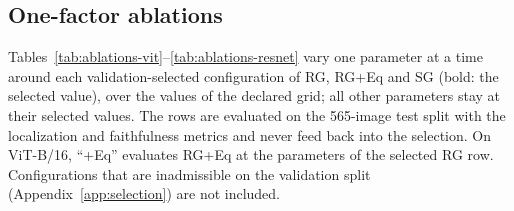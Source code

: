 \documentclass[twoside]{article}
\makeatletter
\newcommand{\1}{\mathbf{1}}
\providecommand{\captionof}[1]{\def\@captype{#1}\caption}
\makeatother
\begin{document}
\providecommand{\absval}[2]{
\begin{tabular}[c]{@{}c@{}}#1\\\textcolor{gray!70}{\scriptsize #2}\end{tabular}}

\subsection{One-factor ablations}\label{app:abl-one-factor}

Tables~\ref{tab:ablations-vit}--\ref{tab:ablations-resnet} vary one parameter at a time around each
validation-selected configuration of \ac{RG}, \ac{RG}+Eq and \ac{SG} (bold: the selected value),
over the values of the declared grid; all other parameters stay at their selected values. The rows
are evaluated on the 565-image test split with the localization and faithfulness metrics and never
feed back into the selection. On ViT-B/16, ``+Eq'' evaluates \ac{RG}+Eq at the parameters of the
selected \ac{RG} row. Configurations that are inadmissible on the validation split
(Appendix~\ref{app:selection}) are not included.

\begin{center}
    \captionof{table}{ViT-B/16, ImageNet-S test split: one-factor ablations around the selected
    configurations. Center: the selected configuration (criterion in parentheses) around which the
    parameter in the Factor column is varied over the Value column, all other parameters fixed; bold:
    the center's own value. Symbols: Appendix~\ref{app:config-symbols}.}
    \label{tab:ablations-vit}
\end{center}
{\small{}}

\begin{center}
    \captionof{table}{VGG-16, ImageNet-S test split: one-factor ablations around the selected
    configurations, as in Table~\ref{tab:ablations-vit}.}
    \label{tab:ablations-vgg}
\end{center}
{\small{}}

\begin{center}
    \captionof{table}{ResNet-50, ImageNet-S test split: one-factor ablations around the selected
    configurations, as in Table~\ref{tab:ablations-vit}.}
    \label{tab:ablations-resnet}
\end{center}
{\small{}}
\end{document}
